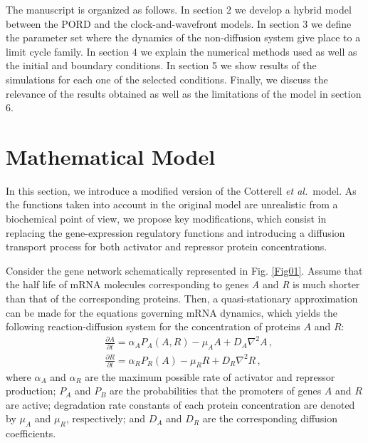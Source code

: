\documentclass[%
 preprint,
 amsmath,amssymb,
 aps,
]{revtex4-2}
\begin{document}
	The manuscript is organized as follows. In section 2 we develop a hybrid
	model between the PORD and the clock-and-wavefront models. In section 3 we 
	define the parameter set where the dynamics of the non-diffusion system give place 
	to a limit cycle family. In section 4 we explain the numerical methods used as 
	well as the initial and boundary conditions. In section 5 we show results of the
	simulations for each one of the selected conditions. Finally, we discuss the 
	relevance of the results obtained as well as the limitations of the model in 
	section 6.
	
	\section{Mathematical Model}
	\label{model}
	
	In this section, we introduce a modified version of the
	Cotterell {\em et al.}~model. As the functions taken into account in the
	original model are unrealistic from a biochemical point of view, we propose key
	modifications, which consist in replacing the gene-expression regulatory
	functions and introducing a diffusion transport process for both activator and
	repressor protein concentrations.
	
	Consider the gene network schematically represented in Fig. \ref{Fig01}. Assume
	that the half life of mRNA molecules corresponding to genes \textit{A} and
	\textit{R} is much shorter than that of the corresponding proteins. Then, a
	quasi-stationary approximation can be made for the equations governing mRNA
	dynamics, which yields the following reaction-diffusion system for the concentration of
	proteins $A$ and $R$:
	\begin{subequations}\label{eq012}
		\begin{flalign}
		& \frac{\partial A}{\partial t} = \alpha_A P_A (A, R) - \mu_A A + D_A \nabla^2 A\,,
		\label{eq01} \\
		& \frac{\partial R}{\partial t} = \alpha_R P_R (A) - \mu_R R + D_R \nabla^2 R\,,
		\label{eq02}
		\end{flalign}
	\end{subequations}
	where $\alpha_A$ and $\alpha_R$ are the maximum possible rate of activator and
	repressor production; $P_A$ and $P_B$ are the probabilities that the promoters
	of genes $A$ and $R$ are active; degradation rate constants of each protein
	concentration are denoted by $\mu_A$ and $\mu_R$, respectively; and $D_A$ and
	$D_R$ are the corresponding diffusion coefficients.
	
\end{document}
